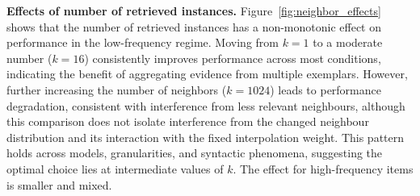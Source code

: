 \noindent \textbf{Effects of number of retrieved instances.} 
Figure~\ref{fig:neighbor_effects} shows that the number of retrieved instances has a non-monotonic effect on performance in the low-frequency regime. Moving from $k=1$ to a moderate number ($k=16$) consistently improves performance across most conditions, indicating the benefit of aggregating evidence from multiple exemplars. However, further increasing the number of neighbors ($k=1024$) leads to performance degradation, consistent with interference from less relevant neighbours, although this comparison does not isolate interference from the changed neighbour distribution and its interaction with the fixed interpolation weight. This pattern holds across models, granularities, and syntactic phenomena, suggesting the optimal choice lies at intermediate values of $k$. The effect for high-frequency items is smaller and mixed. 

